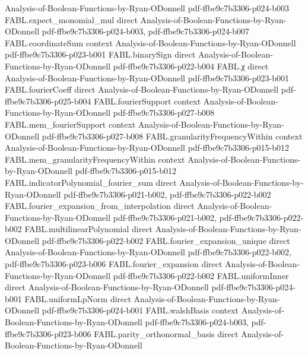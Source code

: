 \begin{theorem}
  {Analysis-of-Boolean-Functions-by-Ryan-ODonnell}
  {pdf-ffbe9c7b3306-p024-b003}
\proofstep
  {FABL.expect_monomial_mul}
  {direct}
  {Analysis-of-Boolean-Functions-by-Ryan-ODonnell}
  {pdf-ffbe9c7b3306-p024-b003,
    pdf-ffbe9c7b3306-p024-b007}
\proofstep
  {FABL.coordinateSum}
  {context}
  {Analysis-of-Boolean-Functions-by-Ryan-ODonnell}
  {pdf-ffbe9c7b3306-p023-b001}
\proofstep
  {FABL.binarySign}
  {direct}
  {Analysis-of-Boolean-Functions-by-Ryan-ODonnell}
  {pdf-ffbe9c7b3306-p022-b004}
\proofstep
  {FABL.χ}
  {direct}
  {Analysis-of-Boolean-Functions-by-Ryan-ODonnell}
  {pdf-ffbe9c7b3306-p023-b001}
\proofstep
  {FABL.fourierCoeff}
  {direct}
  {Analysis-of-Boolean-Functions-by-Ryan-ODonnell}
  {pdf-ffbe9c7b3306-p025-b004}
\proofstep
  {FABL.fourierSupport}
  {context}
  {Analysis-of-Boolean-Functions-by-Ryan-ODonnell}
  {pdf-ffbe9c7b3306-p027-b008}
\proofstep
  {FABL.mem_fourierSupport}
  {context}
  {Analysis-of-Boolean-Functions-by-Ryan-ODonnell}
  {pdf-ffbe9c7b3306-p027-b008}
\proofstep
  {FABL.granularityFrequencyWithin}
  {context}
  {Analysis-of-Boolean-Functions-by-Ryan-ODonnell}
  {pdf-ffbe9c7b3306-p015-b012}
\proofstep
  {FABL.mem_granularityFrequencyWithin}
  {context}
  {Analysis-of-Boolean-Functions-by-Ryan-ODonnell}
  {pdf-ffbe9c7b3306-p015-b012}
\proofstep
  {FABL.indicatorPolynomial_fourier_sum}
  {direct}
  {Analysis-of-Boolean-Functions-by-Ryan-ODonnell}
  {pdf-ffbe9c7b3306-p021-b002,
    pdf-ffbe9c7b3306-p022-b002}
\proofstep
  {FABL.fourier_expansion_from_interpolation}
  {direct}
  {Analysis-of-Boolean-Functions-by-Ryan-ODonnell}
  {pdf-ffbe9c7b3306-p021-b002,
    pdf-ffbe9c7b3306-p022-b002}
\proofstep
  {FABL.multilinearPolynomial}
  {direct}
  {Analysis-of-Boolean-Functions-by-Ryan-ODonnell}
  {pdf-ffbe9c7b3306-p022-b002}
\proofstep
  {FABL.fourier_expansion_unique}
  {direct}
  {Analysis-of-Boolean-Functions-by-Ryan-ODonnell}
  {pdf-ffbe9c7b3306-p022-b002,
    pdf-ffbe9c7b3306-p023-b006}
\proofstep
  {FABL.fourier_expansion}
  {direct}
  {Analysis-of-Boolean-Functions-by-Ryan-ODonnell}
  {pdf-ffbe9c7b3306-p022-b002}
\proofstep
  {FABL.uniformInner}
  {direct}
  {Analysis-of-Boolean-Functions-by-Ryan-ODonnell}
  {pdf-ffbe9c7b3306-p024-b001}
\proofstep
  {FABL.uniformLpNorm}
  {direct}
  {Analysis-of-Boolean-Functions-by-Ryan-ODonnell}
  {pdf-ffbe9c7b3306-p024-b001}
\proofstep
  {FABL.walshBasis}
  {context}
  {Analysis-of-Boolean-Functions-by-Ryan-ODonnell}
  {pdf-ffbe9c7b3306-p024-b003,
    pdf-ffbe9c7b3306-p023-b006}
\proofstep
  {FABL.parity_orthonormal_basis}
  {direct}
  {Analysis-of-Boolean-Functions-by-Ryan-ODonnell}

\end{theorem}
